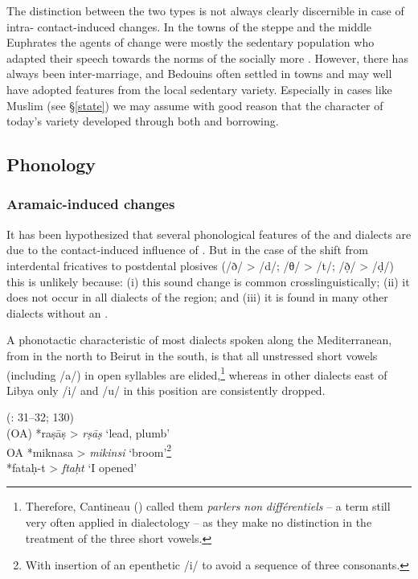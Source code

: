 \documentclass[output=paper]{langsci/langscibook}
\begin{document}
The distinction between the two  types is not always clearly discernible in case of intra- contact-induced changes. In the towns of the  steppe and the middle Euphrates the agents of change were mostly the sedentary population who adapted their speech towards the norms of the socially more  . However, there has always been inter-marriage, and Bedouins often settled in towns and may well have adopted features from the local sedentary variety. Especially in cases like Muslim  (see §\ref{state}) we may assume with good reason that the  character of today’s variety developed through both  and borrowing. 

  \subsection{Phonology} 
 \subsubsection{Aramaic-induced changes} 

It has been hypothesized that several phonological features of the  and  dialects are due to the contact-induced influence of . But in the case of the shift from interdental fricatives to postdental plosives (/ð/ > /d/; /θ/ > /t/; /ð̣/ > /ḍ/) this is unlikely because: (i) this sound change is common crosslinguistically; (ii) it does not occur in all dialects of the region; and (iii) it is found in many other  dialects without an  . 

A phonotactic characteristic of most dialects spoken along the Mediterranean, from  in the north to Beirut in the south, is that all unstressed short vowels (including /a/) in open syllables are elided,\footnote{Therefore, Cantineau (\citeyear[108]{Cantineau1960book}) called them \textit{parlers} \textit{non} \textit{différentiels} – a term still very often applied in  dialectology – as they make no distinction in the treatment of the three short vowels.} whereas in other dialects east of Libya only /i/ and /u/ in this position are consistently dropped.

\ea
{  (\citealt{Procházka2002Cukurova}: 31--32; 130)}\\
  \textup{  (OA)} *raṣāṣ > \textit{rṣāṣ}  \textup{‘lead, plumb’\\
OA} *miknasa > \textit{mikinsi} ‘\textup{broom’}\footnote{With insertion of an epenthetic /i/ to avoid a sequence of three consonants.}\\
*fataḥ-t > \textit{ftaḥt} ‘\textup{I opened’}\\
  \z
  
\end{document}
